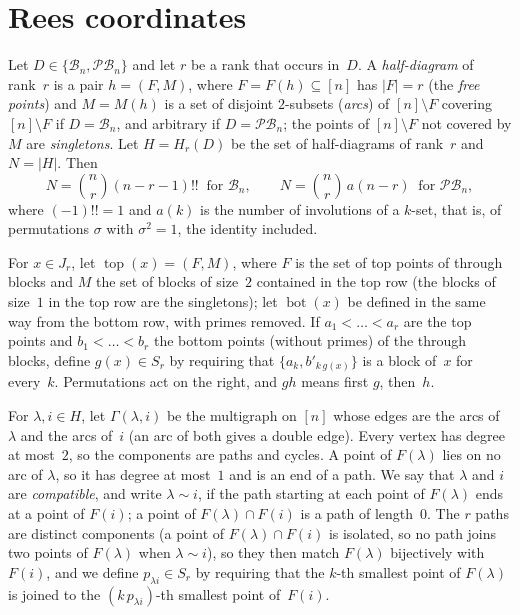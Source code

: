 \documentclass[11pt]{article}
\theoremstyle{remark}
\newcommand{\B}{\mathcal B}
\newcommand{\PB}{\mathcal{PB}}
\newcommand{\tp}{\operatorname{top}}
\newcommand{\bt}{\operatorname{bot}}
\begin{document}
\section{Rees coordinates}\label{sec:rees}
Let $D\in\{\B_n,\PB_n\}$ and let $r$ be a rank that occurs in~$D$. A
\emph{half-diagram} of rank~$r$ is a pair $h=(F,M)$, where $F=F(h)\subseteq[n]$
has $|F|=r$ (the \emph{free points}) and $M=M(h)$ is a set of disjoint
$2$-subsets (\emph{arcs}) of $[n]\setminus F$ covering $[n]\setminus F$ if
$D=\B_n$, and arbitrary if $D=\PB_n$; the points of $[n]\setminus F$ not
covered by $M$ are \emph{singletons}. Let $H=H_r(D)$ be the set of
half-diagrams of rank~$r$ and $N=|H|$. Then
\[
 N=\binom nr(n-r-1)!!\ \text{ for }\B_n,\qquad N=\binom nr\,a(n-r)\ \text{ for
 }\PB_n,
\]
where $(-1)!!=1$ and $a(k)$ is the number of involutions of a $k$-set, that
is, of permutations $\sigma$ with $\sigma^2=1$, the identity included.

For $x\in J_r$, let $\tp(x)=(F,M)$, where $F$ is the set of top points of
through blocks and $M$ the set of blocks of size~$2$ contained in the top row
(the blocks of size~$1$ in the top row are the singletons); let $\bt(x)$ be
defined in the same way from the bottom row, with primes removed.
If $a_1<\dots<a_r$ are the top points and $b_1<\dots<b_r$ the bottom points
(without primes) of the through blocks, define $g(x)\in S_r$ by requiring that
$\{a_k,b'_{k\,g(x)}\}$ is a block of~$x$ for every~$k$. Permutations act on the
right, and $gh$ means first $g$, then~$h$.

For $\lambda,i\in H$, let $\Gamma(\lambda,i)$ be the multigraph on $[n]$ whose
edges are the arcs of $\lambda$ and the arcs of~$i$ (an arc of both gives a
double edge). Every vertex has degree at most~$2$, so the components are paths
and cycles. A point of $F(\lambda)$ lies on no arc of $\lambda$, so it has
degree at most~$1$ and is an end of a path. We say that $\lambda$ and $i$ are
\emph{compatible}, and write $\lambda\sim i$, if the path starting at each
point of $F(\lambda)$ ends at a point of $F(i)$; a point of $F(\lambda)\cap
F(i)$ is a path of length~$0$. The $r$ paths are distinct components (a point
of $F(\lambda)\cap F(i)$ is isolated, so no path joins two points of
$F(\lambda)$ when $\lambda\sim i$), so they then match $F(\lambda)$
bijectively with $F(i)$, and we define $p_{\lambda
i}\in S_r$ by requiring that the $k$-th smallest point of $F(\lambda)$ is joined
to the $(k\,p_{\lambda i})$-th smallest point of~$F(i)$.
\end{document}
